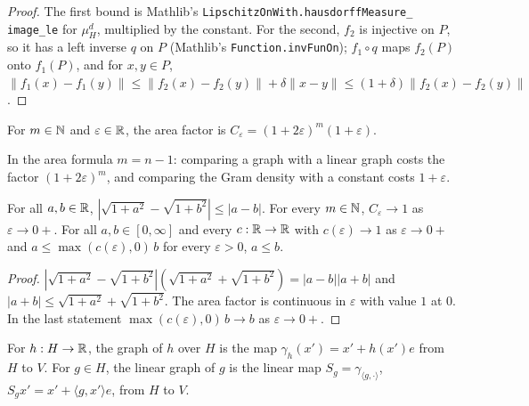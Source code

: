\begin{proof}
\leanok
The first bound is Mathlib's \texttt{LipschitzOnWith.\allowbreak hausdorffMeasure\_\allowbreak
image\_\allowbreak le} for $\mu_H^d$, multiplied by the constant. For the second, $f_2$ is
injective on $P$, so it has a left inverse $q$ on $P$ (Mathlib's
\texttt{Function.\allowbreak invFunOn}); $f_1 \circ q$ maps $f_2(P)$ onto $f_1(P)$, and for
$x, y \in P$,
$\|f_1(x) - f_1(y)\| \leq \|f_2(x) - f_2(y)\| + \delta \|x - y\|
\leq (1 + \delta) \|f_2(x) - f_2(y)\|$.
\end{proof}

\begin{definition}
\label{def:area-factor}
\leanok
For $m \in \mathbb{N}$ and $\varepsilon \in \mathbb{R}$, the area factor is
$C_\varepsilon = (1 + 2\varepsilon)^m (1 + \varepsilon)$.
\end{definition}

In the area formula $m = n - 1$: comparing a graph with a linear graph costs the factor
$(1 + 2\varepsilon)^m$, and comparing the Gram density with a constant costs $1 + \varepsilon$.

\begin{lemma}
\label{lem:area-elementary}
\leanok
{}
For all $a, b \in \mathbb{R}$, $|\sqrt{1 + a^2} - \sqrt{1 + b^2}| \leq |a - b|$. For every $m \in \mathbb{N}$,
$C_\varepsilon \to 1$ as $\varepsilon \to 0+$. For all $a, b \in [0, \infty]$ and every
$c : \mathbb{R} \to \mathbb{R}$ with $c(\varepsilon) \to 1$ as $\varepsilon \to 0+$ and
$a \leq \max(c(\varepsilon), 0) \, b$ for every $\varepsilon > 0$, $a \leq b$.
\end{lemma}

\begin{proof}
\leanok
$|\sqrt{1 + a^2} - \sqrt{1 + b^2}| (\sqrt{1 + a^2} + \sqrt{1 + b^2}) = |a - b| |a + b|$ and
$|a + b| \leq \sqrt{1 + a^2} + \sqrt{1 + b^2}$. The area factor is continuous in $\varepsilon$
with value $1$ at $0$. In the last statement $\max(c(\varepsilon), 0) \, b \to b$ as
$\varepsilon \to 0+$.
\end{proof}

\begin{definition}
\label{def:graph-over}
\leanok
{}
For $h : H \to \mathbb{R}$, the graph of $h$ over $H$ is the map $\gamma_h(x') = x' + h(x') e$ from $H$ to
$V$. For $g \in H$, the linear graph of $g$ is the linear map
$S_g = \gamma_{\langle g, \cdot \rangle}$, $S_g x' = x' + \langle g, x' \rangle e$, from $H$ to
$V$.
\end{definition}

